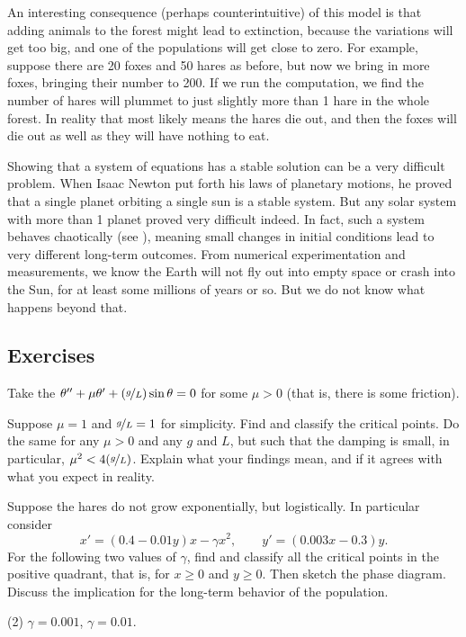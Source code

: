 An interesting consequence (perhaps counterintuitive) of this model is that adding animals to
the forest might lead to extinction, because the variations will get too
big, and one of the populations will get close to zero.  For example, suppose there are 20 foxes and 50 hares as
before, but now we bring in more foxes, bringing their number to 200.  If we
run the computation, we find the number of hares will plummet to just
slightly more than 1 hare in the whole forest.  In reality that most
likely means the hares die out, and then the foxes will die out as well
as they will have nothing to eat.

Showing that a system of equations has a stable solution can be a very
difficult problem.  When Isaac Newton put forth his laws of
planetary motions, he proved that a single planet orbiting a single sun is a
stable system.  But any solar system with more than 1 planet proved very
difficult indeed.  In fact, such a system behaves chaotically (see 
), meaning small changes in initial conditions lead to very
different long-term outcomes.  From numerical experimentation and
measurements, we know the Earth will not fly out into empty space
or crash into the Sun, for at least some millions of years or so.
But we do not know what happens beyond that.

\subsection{Exercises}

\begin{exercise}
Take the \emph{} $\theta '' + \mu \theta' +
(\nicefrac{g}{L})
\sin \theta = 0$ for some $\mu > 0$ (that is, there is some friction).
\begin{tasks}
\task
Suppose $\mu = 1$ and $\nicefrac{g}{L} = 1$ for simplicity.
Find and classify the critical points.
\task
Do the same for any $\mu > 0$ and any $g$
and $L$, but such that the damping is small, in particular, $\mu^2 <
4(\nicefrac{g}{L})$.
\task
Explain what your findings mean, and if it agrees with what you
expect in reality.
\end{tasks}
\end{exercise}

\begin{exercise}
Suppose the hares do not grow exponentially, but logistically.  In
particular consider
\begin{equation*}
x' = (0.4-0.01y)x - \gamma x^2, \qquad y' = (0.003x-0.3)y .
\end{equation*}
For the following two values of $\gamma$,
find and classify all the critical points in the positive quadrant, that is, for
$x \geq 0$ and $y \geq 0$.  Then sketch the phase diagram.  Discuss the
implication for the long-term behavior of the population.
\begin{tasks}(2)
\task
$\gamma=0.001$, 
\task
$\gamma=0.01$.
\end{tasks}
\end{exercise}

